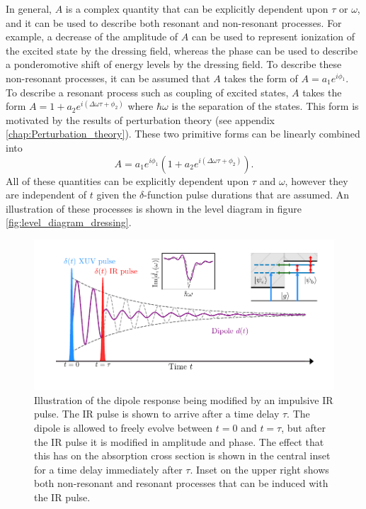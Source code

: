 In general, $A$ is a complex quantity that can be explicitly dependent upon $\tau$ or $\omega$, and it can  be used to describe both resonant and non-resonant processes.  For example, a decrease of the amplitude of $A$ can be used to represent ionization of the excited state by the dressing field, whereas the phase can be used to describe a ponderomotive shift of energy levels by the dressing field.  To describe these non-resonant processes, it can be assumed that $A$ takes the form of $A=a_1e^{i\phi_1}$.  To describe a resonant process such as coupling of excited states, $A$ takes the form $A=1+a_2e^{i(\Delta\omega\tau+\phi_2)}$ where $\hbar\omega$ is the separation of the states.  This form is motivated by the results of perturbation theory (see appendix \ref{chap:Perturbation_theory}).  These two primitive forms can be linearly combined into
\begin{equation}
	A=a_1e^{i\phi_1}(1+a_2e^{i(\Delta\omega\tau+\phi_2)}).
\end{equation}
All of these quantities can be explicitly dependent upon $\tau$ and $\omega$, however they are independent of $t$ given the $\delta$-function pulse durations that are assumed. An illustration of these processes is shown in the level diagram in figure \ref{fig:level_diagram_dressing}.

\begin{figure}
	\centering
	\includegraphics[width=1.0\textwidth]{figures/ATS/dipole_sketch_dressing.pdf}
	\caption[Illustration of the dipole response after being modified by an IR dressing pulse]{Illustration of the dipole response being modified by an impulsive IR pulse.  The IR pulse is shown to arrive after a time delay $\tau$.  The dipole is allowed to freely evolve between $t=0$ and $t=\tau$, but after the IR pulse it is modified in amplitude and phase.  The effect that this has on the absorption cross section is shown in the central inset for a time delay immediately after $\tau$.  Inset on the upper right shows both non-resonant and resonant processes that can be induced with the IR pulse.}
	\label{fig:dipole_sketch_dressing}
\end{figure}

